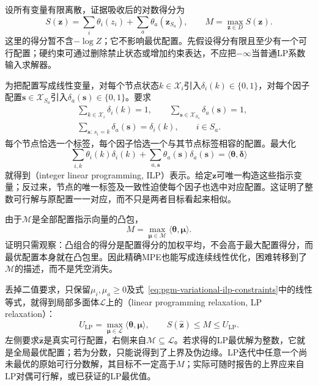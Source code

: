 设所有变量有限离散，证据吸收后的对数得分为
\begin{equation}
  S(\bm z)=\sum_i\theta_i(z_i)
              +\sum_a\theta_a(\bm z_{S_a}),
  \qquad M=\max_{\bm z\in D}S(\bm z).
  \label{eq:pgm-variational-mpe-score}
\end{equation}
这里的得分暂不含$-\log Z$；它不影响最优配置。先假设得分有限且至少有一个可行配置；硬约束可通过删除禁止状态或增加约束表达，不应把$-\infty$当普通LP系数输入求解器。

为把配置写成线性变量，对每个节点状态$k\in\mathcal X_i$引入$\delta_i(k)\in\{0,1\}$，对每个因子配置$\bm s\in\mathcal X_{S_a}$引入$\delta_a(\bm s)\in\{0,1\}$。要求
\begin{equation}
  \begin{aligned}
    &\sum_{k\in\mathcal X_i}\delta_i(k)=1,\qquad
       \sum_{\bm s\in\mathcal X_{S_a}}\delta_a(\bm s)=1,\\
    &\sum_{\bm s:\,s_i=k}\delta_a(\bm s)=\delta_i(k),
        \qquad i\in S_a.
  \end{aligned}
  \label{eq:pgm-variational-ilp-constraints}
\end{equation}
每个节点恰选一个标签，每个因子恰选一个与其节点标签相容的配置。最大化
\[
  \sum_{i,k}\theta_i(k)\delta_i(k)
     +\sum_{a,\bm s}\theta_a(\bm s)\delta_a(\bm s)
     =\langle\bm{\theta},\bm{\delta}\rangle
\]
就得到（integer linear programming, ILP）表示。给定$\bm z$可唯一构造这些指示变量；反过来，节点的唯一标签及一致性迫使每个因子也选中对应配置。这证明了整数可行解与原配置一一对应，而不只是两者目标看起来相似。

由于$\mathcal M$是全部配置指示向量的凸包，
\begin{equation}
  M=\max_{\bm{\mu}\in\mathcal M}
          \langle\bm{\theta},\bm{\mu}\rangle.
  \label{eq:pgm-variational-mpe-marginal}
\end{equation}
证明只需观察：凸组合的得分是配置得分的加权平均，不会高于最大配置得分，而最优配置本身就在凸包里。因此精确MPE也能写成连续线性优化，困难转移到了$\mathcal M$的描述，而不是凭空消失。

丢掉二值要求，只保留$\mu_i,\mu_a\geq0$及式~\eqref{eq:pgm-variational-ilp-constraints}中的线性等式，就得到局部多面体$\mathcal L$上的（linear programming relaxation, LP relaxation）：
\begin{equation}
  U_{\mathrm{LP}}
     =\max_{\bm{\mu}\in\mathcal L}
               \langle\bm{\theta},\bm{\mu}\rangle,
  \qquad
  S(\widehat{\bm z})\leq M\leq U_{\mathrm{LP}}.
  \label{eq:pgm-variational-lp-bound}
\end{equation}
左侧要求$\widehat{\bm z}$是真实可行配置，右侧来自$\mathcal M\subseteq\mathcal L$。若求得的LP最优解为整数，它就是全局最优配置；若为分数，只能说得到了上界及伪边缘。LP迭代中任意一个尚未最优的原始可行分数解，其目标不一定高于$M$；实际可随时报告的上界应来自LP对偶可行解，或已获证的LP最优值。

